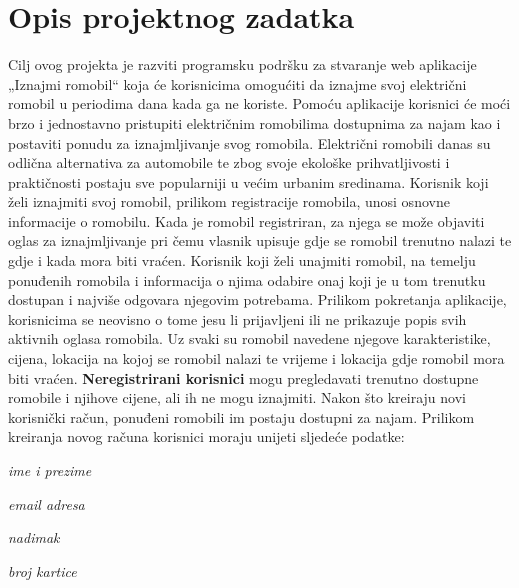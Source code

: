 \chapter{Opis projektnog zadatka}
		
		Cilj ovog projekta je razviti programsku podršku za stvaranje web aplikacije „Iznajmi romobil“ koja će korisnicima omogućiti da iznajme svoj električni romobil u periodima dana kada ga ne koriste. Pomoću aplikacije korisnici će moći brzo i jednostavno pristupiti električnim romobilima dostupnima za najam kao i postaviti ponudu za iznajmljivanje svog romobila. Električni romobili danas su odlična alternativa za automobile te zbog svoje ekološke prihvatljivosti i praktičnosti postaju sve popularniji u većim urbanim sredinama. Korisnik koji želi iznajmiti svoj romobil, prilikom registracije romobila, unosi osnovne informacije o romobilu. Kada je romobil registriran, za njega se može objaviti oglas za iznajmljivanje pri čemu vlasnik upisuje gdje se romobil trenutno nalazi te gdje i kada mora biti vraćen. Korisnik koji želi unajmiti romobil, na temelju ponuđenih romobila i informacija o njima odabire onaj koji je u tom trenutku dostupan i najviše odgovara njegovim potrebama. 
		\newline 
		\newline
		Prilikom pokretanja aplikacije, korisnicima se neovisno o tome jesu li prijavljeni ili ne prikazuje popis svih aktivnih oglasa romobila. Uz svaki su romobil navedene njegove karakteristike, cijena, lokacija na kojoj se romobil nalazi te vrijeme i lokacija gdje romobil mora biti vraćen. \textbf{Neregistrirani korisnici} mogu pregledavati trenutno dostupne romobile i njihove cijene, ali ih ne mogu iznajmiti. Nakon što kreiraju novi korisnički račun, ponuđeni romobili im postaju dostupni za najam. Prilikom kreiranja novog računa korisnici moraju unijeti sljedeće podatke:
		
		\begin{packed_item}
			\item \textit{ime i prezime}
			\item \textit{email adresa}
			\item \textit{nadimak}
			\item \textit{broj kartice}
		\end{packed_item}
		
